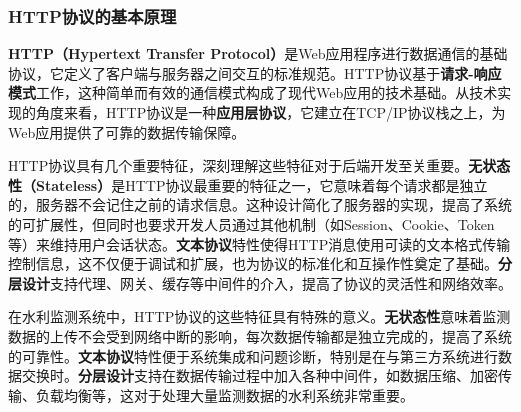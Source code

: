 \begin{Shaded}
\begin{Highlighting}[]
        \OperatorTok{(}\OperatorTok{(}\OperatorTok{,} \OperatorTok{));}
        
    \OperatorTok{\}}  \OperatorTok{(}\OperatorTok{)} \OperatorTok{\{}
        \OperatorTok{(}\OperatorTok{)}
                \OperatorTok{(}\OperatorTok{(} \OperatorTok{+}\OperatorTok{()));}
    \OperatorTok{\}}
\OperatorTok{\}}
\end{Highlighting}
\end{Shaded}

\subsubsection{HTTP协议的基本原理}\label{httpux534fux8baeux7684ux57faux672cux539fux7406}

\textbf{HTTP（Hypertext Transfer Protocol）}是Web应用程序进行数据通信的基础协议，它定义了客户端与服务器之间交互的标准规范。HTTP协议基于\textbf{请求-响应模式}工作，这种简单而有效的通信模式构成了现代Web应用的技术基础。从技术实现的角度来看，HTTP协议是一种\textbf{应用层协议}，它建立在TCP/IP协议栈之上，为Web应用提供了可靠的数据传输保障。

HTTP协议具有几个重要特征，深刻理解这些特征对于后端开发至关重要。\textbf{无状态性（Stateless）}是HTTP协议最重要的特征之一，它意味着每个请求都是独立的，服务器不会记住之前的请求信息。这种设计简化了服务器的实现，提高了系统的可扩展性，但同时也要求开发人员通过其他机制（如Session、Cookie、Token等）来维持用户会话状态。\textbf{文本协议}特性使得HTTP消息使用可读的文本格式传输控制信息，这不仅便于调试和扩展，也为协议的标准化和互操作性奠定了基础。\textbf{分层设计}支持代理、网关、缓存等中间件的介入，提高了协议的灵活性和网络效率。

在水利监测系统中，HTTP协议的这些特征具有特殊的意义。\textbf{无状态性}意味着监测数据的上传不会受到网络中断的影响，每次数据传输都是独立完成的，提高了系统的可靠性。\textbf{文本协议}特性便于系统集成和问题诊断，特别是在与第三方系统进行数据交换时。\textbf{分层设计}支持在数据传输过程中加入各种中间件，如数据压缩、加密传输、负载均衡等，这对于处理大量监测数据的水利系统非常重要。

